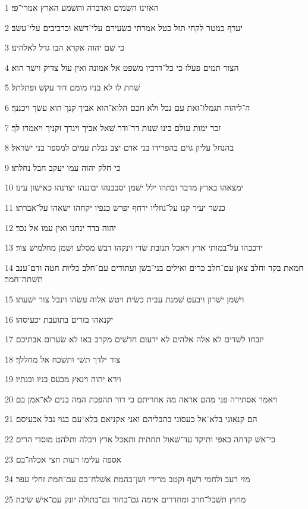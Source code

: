 \par 1 האזינו השׁמים ואדברה ותשׁמע הארץ אמרי־פי׃
\par 2 יערף כמטר לקחי תזל כטל אמרתי כשׂעירם עלי־דשׁא וכרביבים עלי־עשׂב׃
\par 3 כי שׁם יהוה אקרא הבו גדל לאלהינו׃
\par 4 הצור תמים פעלו כי כל־דרכיו משׁפט אל אמונה ואין עול צדיק וישׁר הוא׃
\par 5 שׁחת לו לא בניו מומם דור עקשׁ ופתלתל׃
\par 6 ה־ליהוה תגמלו־זאת עם נבל ולא חכם הלוא־הוא אביך קנך הוא עשׂך ויכננך׃
\par 7 זכר ימות עולם בינו שׁנות דר־ודר שׁאל אביך ויגדך זקניך ויאמרו לך׃
\par 8 בהנחל עליון גוים בהפרידו בני אדם יצב גבלת עמים למספר בני ישׂראל׃
\par 9 כי חלק יהוה עמו יעקב חבל נחלתו׃
\par 10 ימצאהו בארץ מדבר ובתהו ילל ישׁמן יסבבנהו יבוננהו יצרנהו כאישׁון עינו׃
\par 11 כנשׁר יעיר קנו על־גוזליו ירחף יפרשׂ כנפיו יקחהו ישׂאהו על־אברתו׃
\par 12 יהוה בדד ינחנו ואין עמו אל נכר׃
\par 13 ירכבהו על־במותי ארץ ויאכל תנובת שׂדי וינקהו דבשׁ מסלע ושׁמן מחלמישׁ צור׃
\par 14 חמאת בקר וחלב צאן עם־חלב כרים ואילים בני־בשׁן ועתודים עם־חלב כליות חטה ודם־ענב תשׁתה־חמר׃
\par 15 וישׁמן ישׁרון ויבעט שׁמנת עבית כשׂית ויטשׁ אלוה עשׂהו וינבל צור ישׁעתו׃
\par 16 יקנאהו בזרים בתועבת יכעיסהו׃
\par 17 יזבחו לשׁדים לא אלה אלהים לא ידעום חדשׁים מקרב באו לא שׂערום אבתיכם׃
\par 18 צור ילדך תשׁי ותשׁכח אל מחללך׃
\par 19 וירא יהוה וינאץ מכעס בניו ובנתיו׃
\par 20 ויאמר אסתירה פני מהם אראה מה אחריתם כי דור תהפכת המה בנים לא־אמן בם׃
\par 21 הם קנאוני בלא־אל כעסוני בהבליהם ואני אקניאם בלא־עם בגוי נבל אכעיסם׃
\par 22 כי־אשׁ קדחה באפי ותיקד עד־שׁאול תחתית ותאכל ארץ ויבלה ותלהט מוסדי הרים׃
\par 23 אספה עלימו רעות חצי אכלה־בם׃
\par 24 מזי רעב ולחמי רשׁף וקטב מרירי ושׁן־בהמת אשׁלח־בם עם־חמת זחלי עפר׃
\par 25 מחוץ תשׁכל־חרב ומחדרים אימה גם־בחור גם־בתולה יונק עם־אישׁ שׂיבה׃
